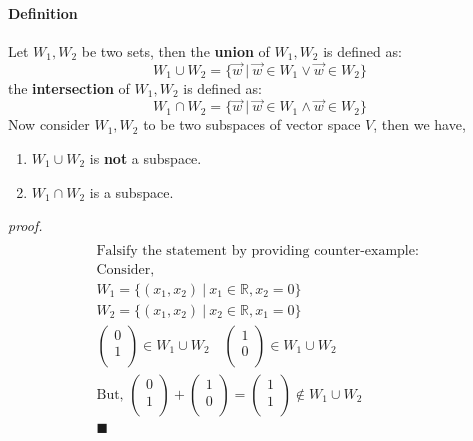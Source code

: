 \documentclass[11pt]{article}
\begin{document}
	\paragraph{Definition} Let $W_1, W_2$ be two sets, then the \textbf{union} of $W_1, W_2$ is defined as:
	\[
	W_1 \cup W_2 = \{\vec{w}\ \vert \ \vec{w} \in W_1 \lor \vec{w} \in W_2\}
	\]
	the \textbf{intersection} of $W_1,W_2$ is defined as:
	\[
	W_1 \cap W_2 = \{\vec{w}\ \vert \ \vec{w} \in W_1 \land \vec{w} \in W_2\}
	\]
	Now consider $W_1,W_2$ to be two subspaces of vector space $V$, then we have,
	\begin{enumerate}
		\item $W_1 \cup W_2$ is \textbf{not} a subspace.
		\item $W_1 \cap W_2$ is a subspace.
	\end{enumerate}
	\emph{proof.}
	\begin{multline*}
		\\
		\text{Falsify the statement by providing counter-example: }\\
		\text{Consider, }\\
		W_1=\{(x_1,x_2)\ \vert\ x_1 \in \mathbb{R}, x_2 = 0\} \\
		W_2=\{(x_1,x_2)\ \vert\ x_2 \in \mathbb{R}, x_1 = 0\} \\
		\begin{pmatrix}
			0 \\
			1 \\
		\end{pmatrix} \in W_1 \cup W_2
		\quad
		\begin{pmatrix}
			1 \\
			0 \\
		\end{pmatrix} \in W_1 \cup W_2 \\
		\text{But, }
		\begin{pmatrix}
			0 \\
			1 \\
		\end{pmatrix} + 
		\begin{pmatrix}
			1 \\
			0 \\
		\end{pmatrix} = 
		\begin{pmatrix}
			1 \\
			1 \\
		\end{pmatrix}
		\notin W_1 \cup W_2 \\
		\blacksquare
	\end{multline*}
\end{document}
